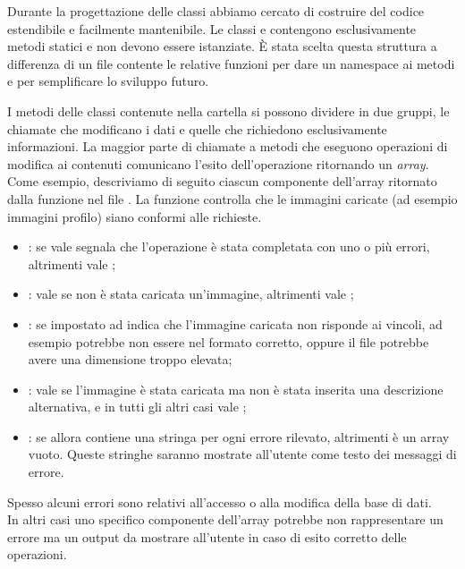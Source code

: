 \documentclass[12pt]{article}
\begin{document}
     Durante la progettazione delle classi abbiamo cercato di costruire del codice estendibile e facilmente mantenibile. Le classi  e  contengono esclusivamente metodi statici e non devono essere istanziate. È stata scelta questa struttura a differenza di un file contente le relative funzioni per dare un namespace ai metodi e per semplificare lo sviluppo futuro.

     I metodi delle classi contenute nella cartella  si possono dividere in due gruppi, le chiamate che modificano i dati e quelle che richiedono esclusivamente informazioni. La maggior parte di chiamate a metodi che eseguono operazioni di modifica ai contenuti comunicano l'esito dell'operazione ritornando un \textit{array}. Come esempio, descriviamo di seguito ciascun componente dell'array  ritornato dalla funzione  nel file . La funzione controlla che le immagini caricate (ad esempio immagini profilo) siano conformi alle richieste.\\
     \begin{itemize}
     	\item {}: se  vale  segnala che l'operazione è stata completata con uno o più errori, altrimenti vale ;
     	\item {}: vale  se non è stata caricata un'immagine, altrimenti vale ;
     	\item {}: se impostato ad  indica che l'immagine caricata non risponde ai vincoli, ad esempio potrebbe non essere nel formato corretto, oppure il file potrebbe avere una dimensione troppo elevata;
     	\item {}: vale  se l'immagine è stata caricata ma non è stata inserita una descrizione alternativa, e in tutti gli altri casi vale ;
     	\item {}: se  allora contiene una stringa per ogni errore rilevato, altrimenti è un array vuoto. Queste stringhe saranno mostrate all'utente come testo dei messaggi di errore.
     \end{itemize}
	 Spesso alcuni errori sono relativi all'accesso o alla modifica della base di dati.\\
	 In altri casi uno specifico componente dell'array potrebbe non rappresentare un errore ma un output da mostrare all'utente in caso di esito corretto delle operazioni.
\end{document}
